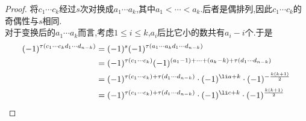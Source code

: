 \documentclass{ctexart}
\begin{document}
\begin{proof}
    将$c_1\cdots c_k$经过$s$次对换成$a_1\cdots a_k$,其中$a_1<\cdots <a_k$.后者是偶排列,因此$c_1\cdots c_k$的奇偶性与$s$相同.\\
    \indent 对于变换后的$a_1\cdots a_k$而言,考虑$1\leqslant i\leqslant k$,$a_i$后比它小的数共有$a_i-i$个.于是
    \[\begin{aligned}
        (-1)^{\tau\left(c_1\cdots c_kd_1\cdots d_{n-k}\right)}
        &= (-1)^s(-1)^{\tau\left(a_1\cdots a_kd_1\cdots d_{n-k}\right)} \\
        &= (-1)^{\tau(c_1\cdots c_k)}(-1)^{\left(a_1-1\right)+\cdots+\left(a_k-k\right)+\tau\left(d_1\cdots d_{n-k}\right)}\\
        &= (-1)^{\tau\left(c_1\cdots c_k\right)+\tau\left(d_1\cdots d_{n-k}\right)}\cdot(-1)^{\li a+k}\cdot(-1)^{-\frac{k(k+1)}{2}}\\
        &= (-1)^{\tau\left(c_1\cdots c_k\right)+\tau\left(d_1\cdots d_{n-k}\right)}\cdot(-1)^{\li c+k}\cdot(-1)^{\frac{k(k+1)}{2}}
    \end{aligned}\]
\end{proof}
\end{document}
